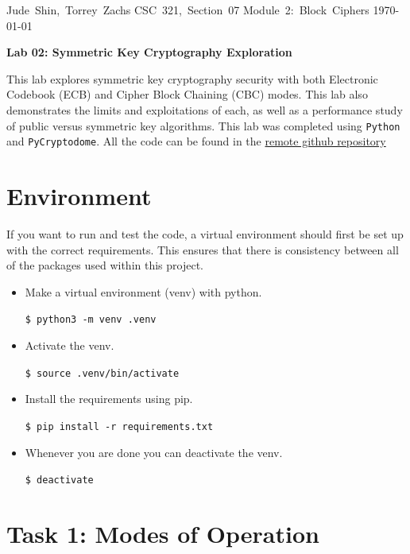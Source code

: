 \documentclass[11pt]{article}
\begin{document}
\hfill\vbox{\hbox{Jude Shin, Torrey Zachs}
		\hbox{CSC 321, Section 07}	
		\hbox{Module 2: Block Ciphers}	
		\hbox{\today}}\par

\bigskip
\centerline{\Large\bf Lab 02: Symmetric Key Cryptography Exploration}\par
\bigskip

This lab explores symmetric key cryptography security with both Electronic Codebook (ECB) and Cipher Block Chaining (CBC) modes. This lab also demonstrates the limits and exploitations of each, as well as a performance study of public versus symmetric key algorithms. This lab was completed using {\tt Python} and {\tt PyCryptodome}. All the code can be found in the \href{https://github.com/jude-shin/CSC\_321}{remote github repository}

\section*{Environment}

If you want to run and test the code, a virtual environment should first be set up with the correct requirements. This ensures that there is consistency between all of the packages used within this project.

\begin{itemize}
	\item Make a virtual environment (venv) with python.

		\verb|$ python3 -m venv .venv|

	\item Activate the venv.

		\verb|$ source .venv/bin/activate|

	\item Install the requirements using pip.

		\verb|$ pip install -r requirements.txt|

	\item Whenever you are done you can deactivate the venv.

		\verb|$ deactivate|

\end{itemize}

\section*{Task 1: Modes of Operation}
\end{document}

